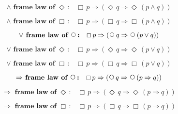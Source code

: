 \documentclass[12pt, fleqn, leqno]{article}
\newcommand{\impl}{\ensuremath{\Rightarrow}}        %
\newcommand{\Next}{\;\,\text{\raisebox{3.5pt}{\circle{6}}}}
\newcommand{\Event}{\Diamond\,}
\newcommand{\Always}{\Box\,}
\newcommand{\spacer}{\vspace{-30pt}}
\begin{document}
\spacer

\begin{equation}\label{E:framelawEvent}
\textbf{$\land$ frame law of $\Event$:}\quad \Always p \impl (\Event q \impl \Event (p \land q))
\end{equation}

\spacer

\begin{equation}\label{E:framelawAlways}
\textbf{$\land$ frame law of $\Always$:}\quad \Always p \impl (\Always q \impl \Always (p \land q))
\end{equation}

\spacer
\begin{equation}\label{E:disjframelawnext}
\textbf{$\lor$ frame law of $\Next$:}\quad \Always p \impl (\Next q \impl \Next (p \lor q))
\end{equation}

\spacer

\begin{equation}\label{E:disjframelawEvent}
\textbf{$\lor$ frame law of $\Event$:}\quad \Always p \impl (\Event q \impl \Event (p \lor q))
\end{equation}

\spacer

\begin{equation}\label{E:disjframelawAlways}
\textbf{$\lor$ frame law of $\Always$:}\quad \Always p \impl (\Always q \impl \Always (p \lor q))
\end{equation}

\spacer

\begin{equation}\label{E:implframelawnext}
\textbf{$\impl$ frame law of $\Next$:}\quad \Always p \impl (\Next q \impl \Next (p \impl q))
\end{equation}

\spacer

\begin{equation}\label{E:implframelawEvent}
\textbf{$\impl$ frame law of $\Event$:}\quad \Always p \impl (\Event q \impl \Event (p \impl q))
\end{equation}

\spacer

\begin{equation}\label{E:implframelawAlways}
\textbf{$\impl$ frame law of $\Always$:}\quad \Always p \impl (\Always q \impl \Always (p \impl q))
\end{equation}
\end{document}
